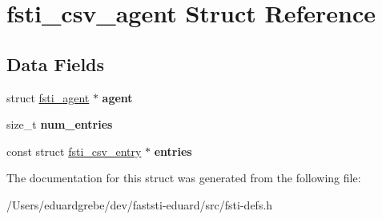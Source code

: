 \hypertarget{structfsti__csv__agent}{}\section{fsti\+\_\+csv\+\_\+agent Struct Reference}
\label{structfsti__csv__agent}
\subsection*{Data Fields}
\begin{DoxyCompactItemize}
\item 
\mbox{\label{structfsti__csv__agent_a4323ae2babc1ce9fe676937a98e25d23}} 
struct \mbox{\hyperlink{structfsti__agent}{fsti\+\_\+agent}} $\ast$ {\bfseries agent}
\item 
\mbox{\label{structfsti__csv__agent_aa57cdad849a5aa0fd9a32a4813c0a5a9}} 
size\+\_\+t {\bfseries num\+\_\+entries}
\item 
\mbox{\label{structfsti__csv__agent_ac58e0cb940257410f80ba13098a96d04}} 
const struct \mbox{\hyperlink{structfsti__csv__entry}{fsti\+\_\+csv\+\_\+entry}} $\ast$ {\bfseries entries}
\end{DoxyCompactItemize}


The documentation for this struct was generated from the following file\+:\begin{DoxyCompactItemize}
\item 
/\+Users/eduardgrebe/dev/faststi-\/eduard/src/fsti-\/defs.\+h\end{DoxyCompactItemize}

